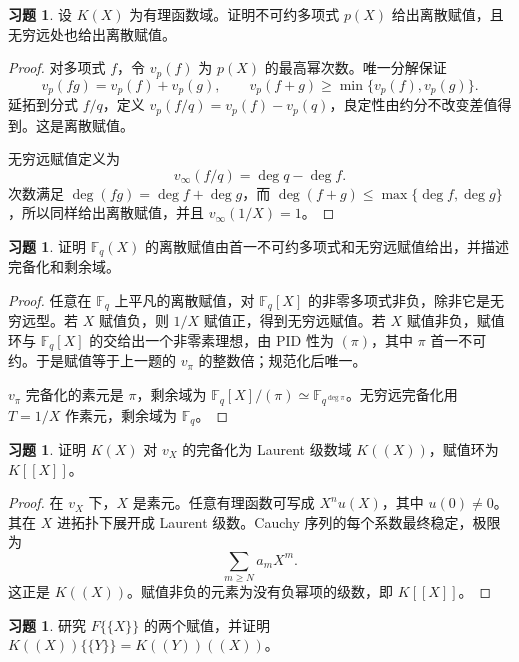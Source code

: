 \documentclass[11pt,a4paper,openany]{ctexbook}
\numberwithin{equation}{chapter}
\newcommand{\F}{\mathbb{F}}
\theoremstyle{plain}
\theoremstyle{definition}
\newtheorem{exercise}[theorem]{习题}
\theoremstyle{remark}
\begin{document}
\begin{exercise}
设 $K(X)$ 为有理函数域。证明不可约多项式 $p(X)$ 给出离散赋值，且无穷远处也给出离散赋值。
\end{exercise}

\begin{proof}
对多项式 $f$，令 $v_p(f)$ 为 $p(X)$ 的最高幂次数。唯一分解保证
\[
  v_p(fg)=v_p(f)+v_p(g),\qquad v_p(f+g)\ge\min\{v_p(f),v_p(g)\}.
\]
延拓到分式 $f/q$，定义 $v_p(f/q)=v_p(f)-v_p(q)$，良定性由约分不改变差值得到。这是离散赋值。

无穷远赋值定义为
\[
  v_\infty(f/q)=\deg q-\deg f.
\]
次数满足 $\deg(fg)=\deg f+\deg g$，而 $\deg(f+g)\le\max\{\deg f,\deg g\}$，所以同样给出离散赋值，并且 $v_\infty(1/X)=1$。
\end{proof}

\begin{exercise}
证明 $\F_q(X)$ 的离散赋值由首一不可约多项式和无穷远赋值给出，并描述完备化和剩余域。
\end{exercise}

\begin{proof}
任意在 $\F_q$ 上平凡的离散赋值，对 $\F_q[X]$ 的非零多项式非负，除非它是无穷远型。若 $X$ 赋值负，则 $1/X$ 赋值正，得到无穷远赋值。若 $X$ 赋值非负，赋值环与 $\F_q[X]$ 的交给出一个非零素理想，由 PID 性为 $(\pi)$，其中 $\pi$ 首一不可约。于是赋值等于上一题的 $v_\pi$ 的整数倍；规范化后唯一。

$v_\pi$ 完备化的素元是 $\pi$，剩余域为 $\F_q[X]/(\pi)\simeq\F_{q^{\deg\pi}}$。无穷远完备化用 $T=1/X$ 作素元，剩余域为 $\F_q$。
\end{proof}

\begin{exercise}
证明 $K(X)$ 对 $v_X$ 的完备化为 Laurent 级数域 $K((X))$，赋值环为 $K[[X]]$。
\end{exercise}

\begin{proof}
在 $v_X$ 下，$X$ 是素元。任意有理函数可写成 $X^nu(X)$，其中 $u(0)\ne0$。其在 $X$ 进拓扑下展开成 Laurent 级数。Cauchy 序列的每个系数最终稳定，极限为
\[
  \sum_{m\ge N}a_mX^m.
\]
这正是 $K((X))$。赋值非负的元素为没有负幂项的级数，即 $K[[X]]$。
\end{proof}

\begin{exercise}
研究 $F\{\{X\}\}$ 的两个赋值，并证明 $K((X))\{\{Y\}\}=K((Y))((X))$。
\end{exercise}
\end{document}
